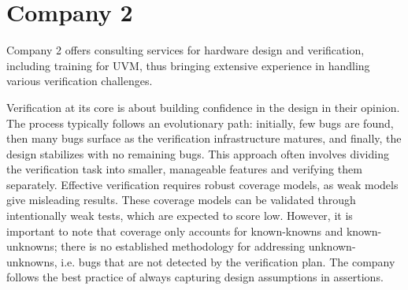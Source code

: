 \documentclass[11pt,a4paper]{report}
\begin{document}

\section{Company 2} %

Company 2 offers consulting services for hardware design and verification, including training for UVM, thus bringing
extensive experience in handling various verification challenges.

Verification at its core is about building confidence in the design in their opinion. The process typically follows
an evolutionary path: initially, few bugs are found, then many bugs surface as the verification infrastructure
matures, and finally, the design stabilizes with no remaining bugs. This approach often involves dividing the
verification task into smaller, manageable features and verifying them separately. Effective verification requires
robust coverage models, as weak models give misleading results. These coverage models can be validated through
intentionally weak tests, which are expected to score low. However, it is important to note that coverage only
accounts for known-knowns and known-unknowns; there is no established methodology for addressing unknown-unknowns,
i.e. bugs that are not detected by the verification plan. The company follows the best practice of always capturing
design assumptions in assertions.
\end{document}
